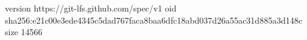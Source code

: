 version https://git-lfs.github.com/spec/v1
oid sha256:e21c00e3ede4345c5dad767faca8baa6dfc18abd037d26a55ac31d885a3d148c
size 14566

